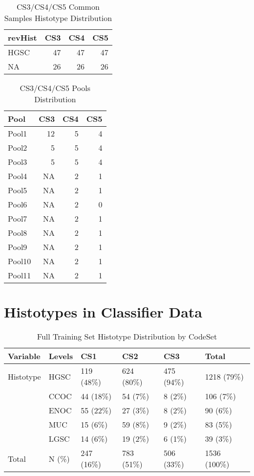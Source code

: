 \documentclass[
]{report}
\begin{document}
\begin{table}

\caption{\label{tab:cs345-overlap}CS3/CS4/CS5 Common Samples Histotype Distribution}
\centering
\begin{tabular}[t]{l|r|r|r}
\hline
revHist & CS3 & CS4 & CS5\\
\hline
HGSC & 47 & 47 & 47\\
\hline
NA & 26 & 26 & 26\\
\hline
\end{tabular}
\end{table}

\begin{table}

\caption{\label{tab:cs345-pools}CS3/CS4/CS5 Pools Distribution}
\centering
\begin{tabular}[t]{l|r|r|r}
\hline
Pool & CS3 & CS4 & CS5\\
\hline
Pool1 & 12 & 5 & 4\\
\hline
Pool2 & 5 & 5 & 4\\
\hline
Pool3 & 5 & 5 & 4\\
\hline
Pool4 & NA & 2 & 1\\
\hline
Pool5 & NA & 2 & 1\\
\hline
Pool6 & NA & 2 & 0\\
\hline
Pool7 & NA & 2 & 1\\
\hline
Pool8 & NA & 2 & 1\\
\hline
Pool9 & NA & 2 & 1\\
\hline
Pool10 & NA & 2 & 1\\
\hline
Pool11 & NA & 2 & 1\\
\hline
\end{tabular}
\end{table}

\hypertarget{histotypes-in-classifier-data}{%
\section{Histotypes in Classifier Data}\label{histotypes-in-classifier-data}}

\begin{table}

\caption{\label{tab:train-hist-codeset}Full Training Set Histotype Distribution by CodeSet}
\centering
\begin{tabular}[t]{l|l|l|l|l|l}
\hline
Variable & Levels & CS1 & CS2 & CS3 & Total\\
\hline
Histotype & HGSC & 119 (48\%) & 624 (80\%) & 475 (94\%) & 1218 (79\%)\\
\hline
 & CCOC & 44 (18\%) & 54 (7\%) & 8 (2\%) & 106 (7\%)\\
\hline
 & ENOC & 55 (22\%) & 27 (3\%) & 8 (2\%) & 90 (6\%)\\
\hline
 & MUC & 15 (6\%) & 59 (8\%) & 9 (2\%) & 83 (5\%)\\
\hline
 & LGSC & 14 (6\%) & 19 (2\%) & 6 (1\%) & 39 (3\%)\\
\hline
Total & N (\%) & 247 (16\%) & 783 (51\%) & 506 (33\%) & 1536 (100\%)\\
\hline
\end{tabular}
\end{table}
\end{document}
